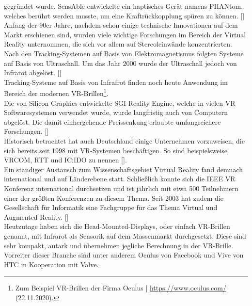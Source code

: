 \documentclass[a4paper,12pt,oneside]{article}
\begin{document}
        gegründet wurde. SensAble entwickelte ein haptisches Gerät namens 
        \glqq PHANtom\grqq{}, welches berührt werden musste, um eine
        Kraftrückkopplung spüren zu können. [\cite[20]{Dorner2013}] \\
        Anfang der 90er Jahre, nachdem schon einige technische Innovationen auf dem Markt
        erschienen sind, wurden viele wichtige Forschungen im Bereich der Virtual Reality
        unternommen, die sich vor allem auf Stereoleinwände konzentrierten.
        Nach den Tracking-Systemen auf Basis von Elektromagnetismus folgten Systeme auf
        Basis von Ultraschall. Um das Jahr 2000 wurde der Ultraschall jedoch von Infrarot
        abgelöst. [\cite[20-21]{Dorner2013}] \\ 
        Tracking-Systeme auf Basis von Infrafrot finden noch heute Anwendung im
        Bereich der modernen VR-Brillen\footnote{Zum Beispiel VR-Brillen der Firma Oculus | \url{https://www.oculus.com/} (22.11.2020).}. \\
        Die von Silicon Graphics entwickelte SGI Reality Engine, welche in vielen
        VR Softwaresystemen verwendet wurde, wurde langfristig auch von Computern
        abgelöst. Die damit einhergehende Preissenkung
        erlaubte umfangreichere Forschungen. [\cite[20-21]{Dorner2013}] \\
        Historisch betrachtet hat auch Deutschland einige Unternehmen vorzuweisen, die sich
        bereits seit 1998 mit VR-Systemen beschäftigen. So sind beispielsweise VRCOM, 
        RTT und IC:IDO zu nennen [\cite[20-21]{Dorner2013}]. \\
        Ein ständiger Austausch zum Wissenschaftsgebiet Virtual Reality fand demnach international
        und auf Länderebene statt. Schließlich konnte sich die IEEE VR Konferenz
        international durchsetzen und ist jährlich mit etwa 500 Teilnehmern einer der
        größten Konferenzen zu diesem Thema.
        Seit 2003 hat zudem die Gesellschaft für Informatik eine Fachgruppe für das Thema
        Virtual und Augmented Reality. [\cite[19-21]{Dorner2013}] \\
        Heutzutage haben sich die Head-Mounted-Displays, oder einfach VR-Brillen genannt,
        mit Infrarot als Sensorik auf dem Massenmarkt durchgesetzt. Diese sind sehr kompakt,
        autark und
        übernehmen jegliche Berechnung in der VR-Brille. Vorreiter dieser Branche sind unter
        anderem Oculus von Facebook und Vive von HTC in Kooperation mit Valve.
\end{document}
